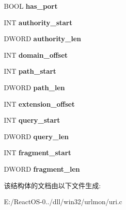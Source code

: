 \begin{DoxyCompactItemize}
B\+O\+OL {\bfseries has\+\_\+port}
\item 
\mbox{\label{struct_uri_ac5643cc073c2a8f4eee2e9c34e81d1f6}} 
I\+NT {\bfseries authority\+\_\+start}
\item 
\mbox{\label{struct_uri_ad695f6bda85a13434c0a6b51622f97ff}} 
D\+W\+O\+RD {\bfseries authority\+\_\+len}
\item 
\mbox{\label{struct_uri_a865e5cd4f821e5dbfc93d8571902dee2}} 
I\+NT {\bfseries domain\+\_\+offset}
\item 
\mbox{\label{struct_uri_a0868d2f99b2ab301aa975f523a8d3e31}} 
I\+NT {\bfseries path\+\_\+start}
\item 
\mbox{\label{struct_uri_a12077546826db8c004c2b2e1f562c68d}} 
D\+W\+O\+RD {\bfseries path\+\_\+len}
\item 
\mbox{\label{struct_uri_aa5ca50e8fc395cc5558b4e608d06431f}} 
I\+NT {\bfseries extension\+\_\+offset}
\item 
\mbox{\label{struct_uri_a4768fb930c81c7c9c200af999bdfa722}} 
I\+NT {\bfseries query\+\_\+start}
\item 
\mbox{\label{struct_uri_a28235d7b7c82a2bd5aa4583c16ca6ae5}} 
D\+W\+O\+RD {\bfseries query\+\_\+len}
\item 
\mbox{\label{struct_uri_a3815ad1f00d8bc709c1c27d4d8c4489c}} 
I\+NT {\bfseries fragment\+\_\+start}
\item 
\mbox{\label{struct_uri_a9e79a75257f5c8ba0736bfff11a7616f}} 
D\+W\+O\+RD {\bfseries fragment\+\_\+len}
\end{DoxyCompactItemize}


该结构体的文档由以下文件生成\+:\begin{DoxyCompactItemize}
\item 
E\+:/\+React\+O\+S-\/0../dll/win32/urlmon/uri.\+c\end{DoxyCompactItemize}
